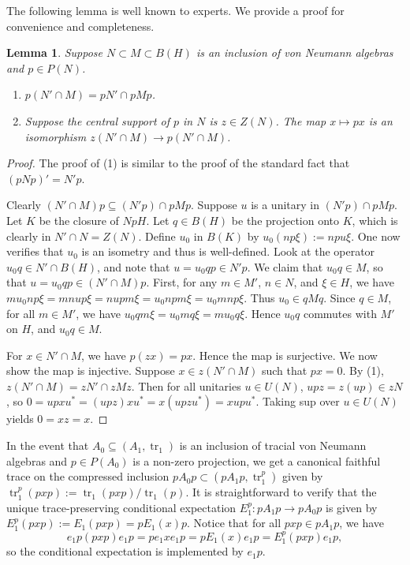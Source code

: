 \documentclass[11pt]{article}
\theoremstyle{plain}
\newtheorem{lem}[thm]{Lemma}
\theoremstyle{definition}
\DeclareMathOperator{\tr}{tr}
\newcommand{\dave}[1]{\marginpar{\tiny \textcolor{orange}{DP: #1}}}
\begin{document}
The following lemma is well known to experts. 
We provide a proof for convenience and completeness.

\begin{lem}
Suppose $N\subset M\subset B(H)$ is an inclusion of von Neumann algebras and $p\in P(N)$.
\begin{enumerate}[(1)]
\item
$p(N'\cap M) = pN' \cap pMp$.
\item
Suppose the central support of $p$ in $N$ is $z\in Z(N)$.
The map $x\mapsto px$ is an isomorphism $z(N'\cap M) \to p(N'\cap M)$.
\end{enumerate}
\dave{this lemma may be more at home later, but it is a purely von Neumann algebraic fact}
\end{lem}
\begin{proof}
\mbox{}
\item[\underline{Proof of (1):}]
The proof of (1) is similar to the proof of the standard fact that $(pNp)' = N'p$.

Clearly $(N'\cap M)p \subseteq (N'p) \cap pMp$.
Suppose $u$ is a unitary in $(N'p) \cap pMp$.
Let $K$ be the closure of $NpH$.
Let $q\in B(H)$ be the projection onto $K$, which is clearly in $N' \cap N = Z(N)$.
Define $u_0$ in $B(K)$ by $u_0 (np\xi) := npu\xi$.
One now verifies that $u_0$ is an isometry and thus is well-defined.
Look at the operator $u_0q \in N' \cap B(H)$, and note that $u = u_0qp \in N'p$.
We claim that $u_0q \in M$, so that $u = u_0qp \in (N' \cap M)p$.
First, for any $m \in M'$, $n \in N$, and $\xi\in H$,
we have
$mu_0np\xi  = mnup\xi = nupm\xi = u_0npm\xi = u_0mnp\xi$.
Thus $u_0 \in qMq$.
Since $q \in M$, for all $m \in M'$, we have $u_0qm\xi = u_0mq\xi = mu_0q\xi$.
Hence $u_0q$ commutes with $M'$ on $H$, and $u_0q \in M$. 

\item[\underline{Proof of (2):}]
For $x\in N'\cap M$, we have $p(zx) = px$.
Hence the map is surjective.
We now show the map is injective.
Suppose $x \in z(N'\cap M)$ such that $px = 0$.
By (1), $z(N'\cap M) = zN' \cap zMz$.
Then for all unitaries $u\in U(N)$, $upz = z(up) \in zN$, so 
$0 = upxu^* = (upz)xu^* = x(upzu^*) = xupu^*$.
Taking sup over $u \in U(N)$ yields $0 = xz = x$.
\end{proof}

In the event that $A_0 \subseteq (A_1, \tr_1)$ is an inclusion of tracial von Neumann algebras and $p\in P(A_0)$ is a non-zero projection, we get a canonical faithful trace on the compressed inclusion $pA_0p \subset (pA_1p, \tr_1^p)$ given by $\tr^p_1(pxp):= \tr_1(pxp)/\tr_1(p)$.
It is straightforward to verify that the unique trace-preserving conditional expectation $E^p_1 : pA_1p \to pA_0p$ is given by $E^p_1(pxp) := E_1(pxp) = pE_1(x)p$. 
Notice that for all $pxp \in pA_1 p$, we have 
\begin{equation}
\label{eq:CompressionImplementsConditionalExpectation}
e_1p (pxp) e_1p = p e_1xe_1p = pE_1(x)e_1p = E_1^p(pxp)e_1p,
\end{equation}
so the conditional expectation is implemented by $e_1p$.
\end{document}
